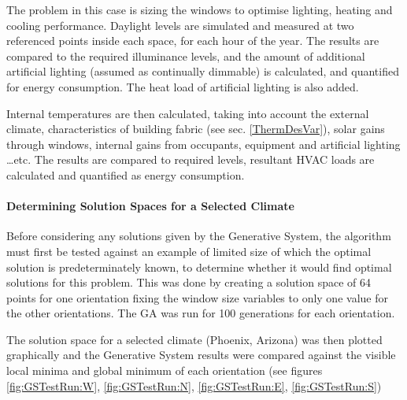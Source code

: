 The problem in this case is sizing the windows to optimise lighting, heating and cooling performance. Daylight levels are simulated and measured at two referenced points inside each space, for each hour of the year. The results are compared to the required illuminance levels, and the amount of additional artificial lighting (assumed as continually dimmable) is calculated, and quantified for energy consumption. The heat load of artificial lighting is also added.

Internal temperatures are then calculated, taking into account the external climate, characteristics of building fabric (see sec. \ref{ThermDesVar}), solar gains through windows, internal gains from occupants, equipment and artificial lighting \ldots\hspace{0cm}etc. The results are compared to required levels, resultant HVAC loads are calculated and quantified as energy consumption. 

\paragraph{Determining Solution Spaces for a Selected Climate}\mbox{}

Before considering any solutions given by the Generative System, the algorithm must first be tested against an example of limited size of which the optimal solution is predeterminately known, to determine whether it would find optimal solutions for this problem. This was done by creating a solution space of 64 points for one orientation fixing the window size variables to only one value for the other orientations. The GA was run for 100 generations for each orientation.

The solution space for a selected climate (Phoenix, Arizona) was then plotted graphically and the Generative System results were compared against the visible local minima and global minimum of each orientation (see figures \ref{fig:GSTestRun:W}, \ref{fig:GSTestRun:N}, \ref{fig:GSTestRun:E}, \ref{fig:GSTestRun:S})

